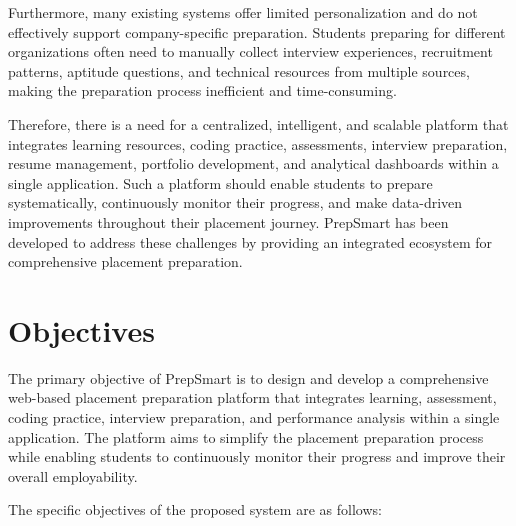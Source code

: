 Furthermore, many existing systems offer limited personalization and do not effectively support company-specific preparation. Students preparing for different organizations often need to manually collect interview experiences, recruitment patterns, aptitude questions, and technical resources from multiple sources, making the preparation process inefficient and time-consuming.

Therefore, there is a need for a centralized, intelligent, and scalable platform that integrates learning resources, coding practice, assessments, interview preparation, resume management, portfolio development, and analytical dashboards within a single application. Such a platform should enable students to prepare systematically, continuously monitor their progress, and make data-driven improvements throughout their placement journey. PrepSmart has been developed to address these challenges by providing an integrated ecosystem for comprehensive placement preparation.

\section{Objectives}

The primary objective of PrepSmart is to design and develop a comprehensive web-based placement preparation platform that integrates learning, assessment, coding practice, interview preparation, and performance analysis within a single application. The platform aims to simplify the placement preparation process while enabling students to continuously monitor their progress and improve their overall employability.

The specific objectives of the proposed system are as follows:

